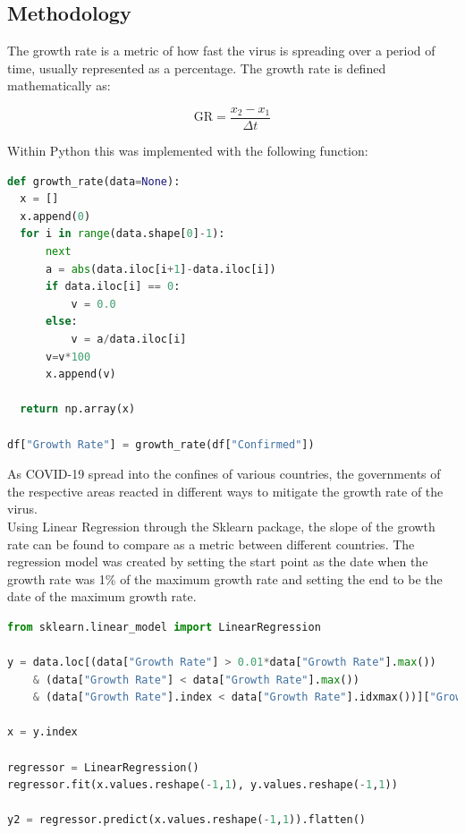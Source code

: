 \documentclass{homework}
\begin{document}
\subsection{Methodology}

The growth rate is a metric of how fast the virus is spreading over a period of time, usually represented as a percentage. The growth rate is defined mathematically as:

\begin{equation}
  \text{GR} = \frac{x_2 - x_1}{\Delta{t}}
\end{equation}

Within Python this was implemented with the following function:

\begin{lstlisting}[language=Python, caption={Growth Rate Function}, firstnumber=56]
def growth_rate(data=None):
  x = []
  x.append(0)
  for i in range(data.shape[0]-1):
      next
      a = abs(data.iloc[i+1]-data.iloc[i])
      if data.iloc[i] == 0:
          v = 0.0
      else:
          v = a/data.iloc[i]
      v=v*100
      x.append(v)
      
  return np.array(x)

df["Growth Rate"] = growth_rate(df["Confirmed"])
\end{lstlisting}

As COVID-19 spread into the confines of various countries, the governments of the respective areas reacted in different ways to mitigate the growth rate of the virus. \\

Using Linear Regression through the Sklearn package, the slope of the growth rate can be found to compare as a metric between different countries. The regression model was created by setting the start point as the date when the growth rate was 1\% of the maximum growth rate and setting the end to be the date of the maximum growth rate.

\begin{lstlisting}[language=Python, caption={Growth Rate Linear Regression}, firstnumber=78]
from sklearn.linear_model import LinearRegression

y = data.loc[(data["Growth Rate"] > 0.01*data["Growth Rate"].max()) 
    & (data["Growth Rate"] < data["Growth Rate"].max()) 
    & (data["Growth Rate"].index < data["Growth Rate"].idxmax())]["Growth Rate"]

x = y.index

regressor = LinearRegression()  
regressor.fit(x.values.reshape(-1,1), y.values.reshape(-1,1))

y2 = regressor.predict(x.values.reshape(-1,1)).flatten()
\end{lstlisting}
\end{document}
